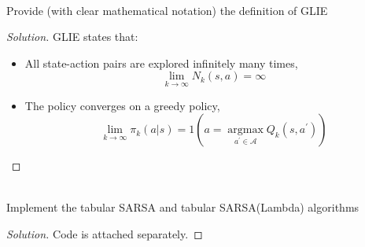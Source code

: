 \documentclass[12pt]{article}
\newenvironment{problem}[2][Problem]{\begin{trivlist}
\item[\hskip \labelsep {\bfseries #1}\hskip \labelsep {\bfseries #2.}]}{\end{trivlist}}
\newenvironment{solution}
  {\renewcommand\qedsymbol{$\blacksquare$}\begin{proof}[Solution]}
  {\end{proof}}
\begin{document}
\newpage
\begin{problem}{2}
	\text{ }\\
	Provide (with clear mathematical notation) the definition of \gls{GLIE}
\end{problem}
\begin{solution}
	\gls{GLIE} states that: 
	\begin{itemize}[noitemsep]
		\item All state-action pairs are explored infinitely many times,
		\begin{equation}
			\lim _{k \rightarrow \infty} N_{k}(s, a)=\infty
		\end{equation}
		\item The policy converges on a greedy policy,
		\begin{equation}
		\lim _{k \rightarrow \infty} \pi_{k}(a | s)=1\left(a=\underset{a^{\prime} \in \mathcal{A}}{\operatorname{argmax}} Q_{k}\left(s, a^{\prime}\right)\right)
		\end{equation}
	\end{itemize}
\end{solution}

\begin{problem}{3}
	\text{ }\\
	Implement the tabular SARSA and tabular SARSA(Lambda) algorithms
\end{problem}
\begin{solution}
	Code is attached separately.
\end{solution}
\end{document}
